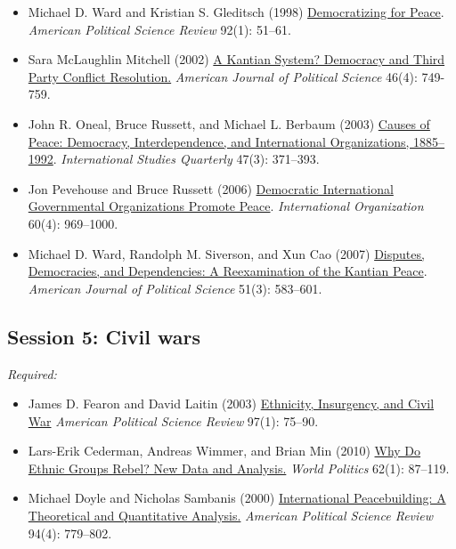 \documentclass[12pt, a4paper]{article}
\begin{document}
\begin{itemize}
  \item Michael D. Ward and Kristian S. Gleditsch (1998) \href{https://doi.org/10.2307/2585928}{Democratizing for Peace}. \textit{American Political Science Review} 92(1): 51--61.
	\item Sara McLaughlin Mitchell (2002) \href{https://doi.org/10.2307/3088431}{A Kantian System? Democracy and Third Party Conflict Resolution.} \textit{American Journal of Political Science} 46(4): 749-759.
	\item John R. Oneal, Bruce Russett, and Michael L. Berbaum (2003) \href{https://doi.org/10.1111/1468-2478.4703004}{Causes of Peace: Democracy, Interdependence, and International Organizations, 1885–1992}. \textit{International Studies Quarterly} 47(3): 371--393.
	\item Jon Pevehouse and Bruce Russett (2006) \href{https://doi.org/10.1017/S0020818306060322}{Democratic International Governmental Organizations Promote Peace}. \textit{International Organization} 60(4): 969--1000.
  \item Michael D. Ward, Randolph M. Siverson, and Xun Cao (2007) \href{https://doi.org/10.1111/j.1540-5907.2007.00269.x}{Disputes, Democracies, and Dependencies: A Reexamination of the Kantian Peace}. \textit{American Journal of Political Science} 51(3): 583--601.
\end{itemize}


\vspace{20pt}
\hline
\subsection*{Session 5: Civil wars}

\noindent\textit{Required:}

\begin{itemize}
  \item James D. Fearon and David Laitin (2003) \href{https://doi.org/10.1017/S0003055403000534}{Ethnicity, Insurgency, and Civil War} \textit{American Political Science Review} 97(1): 75--90.
  \item Lars-Erik Cederman, Andreas Wimmer, and Brian Min (2010) \href{https://doi.org/10.1017/S0043887109990219}{Why Do Ethnic Groups Rebel? New Data and Analysis.} \textit{World Politics} 62(1): 87--119.
  \item Michael Doyle and Nicholas Sambanis (2000) \href{https://doi.org/10.2307/2586208}{International Peacebuilding: A Theoretical and Quantitative Analysis.} \textit{American Political Science Review} 94(4): 779--802.
\end{itemize}
\end{document}
